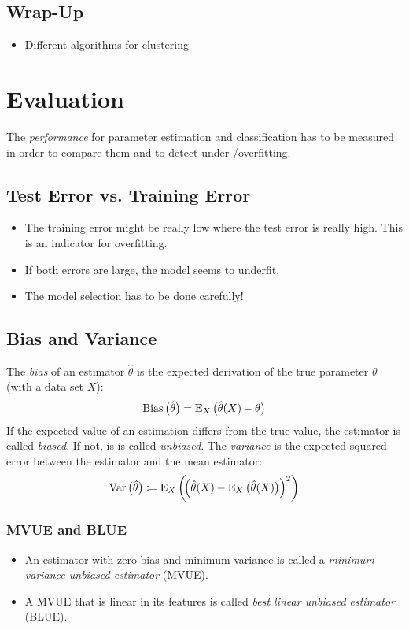 	\section{Wrap-Up}
		\begin{itemize}
			\item Different algorithms for clustering
		\end{itemize}

\chapter{Evaluation}
	The \emph{performance} for parameter estimation and classification has to be measured in order to compare them and to detect under-/overfitting.

	\section{Test Error vs. Training Error}
		\begin{itemize}
			\item The training error might be really low where the test error is really high. This is an indicator for overfitting.
			\item If both errors are large, the model seems to underfit.
			\item The model selection has to be done carefully!
		\end{itemize}

	\section{Bias and Variance}
		The \emph{bias} of an estimator \(\hat{\theta}\) is the expected derivation of the true parameter \(\theta\) (with a data set \(X\)):
		\begin{equation}
			\operatorname{Bias}\big(\hat{\theta}\big) = \operatorname{E}_X\big(\hat{\theta}(X) - \theta\big)
		\end{equation}
		If the expected value of an estimation differs from the true value, the estimator is called \emph{biased}. If not, is is called \emph{unbiased}. The \emph{variance} is the expected squared error between the estimator and the mean estimator:
		\begin{equation}
			\operatorname{Var}\big(\hat{\theta}\big) \coloneqq \operatorname{E}_X\bigg( \! \Big( \hat{\theta}(X) - \operatorname{E}_X\big(\hat{\theta}(X)\big) \Big)^2 \bigg)
		\end{equation}

		\subsection{MVUE and BLUE}
			\begin{itemize}
				\item An estimator with zero bias and minimum variance is called a \emph{minimum variance unbiased estimator} (MVUE).
				\item A MVUE that is linear in its features is called \emph{best linear unbiased estimator} (BLUE).
			\end{itemize}

